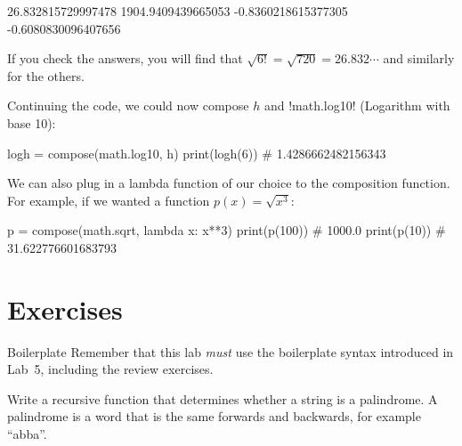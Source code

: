 \documentclass[11pt]{cselabheader}
\begin{document}
\begin{verbatimcode}
26.832815729997478
1904.9409439665053
-0.8360218615377305
-0.6080830096407656
\end{verbatimcode}

If you check the answers, you will find that $\sqrt{ 6! } = \sqrt{ 720 } =
26.832\cdots$ and similarly for the others.

Continuing the code, we could now compose $h$ and \pythoninline!math.log10!
(Logarithm with base 10):
\begin{python3code}
logh = compose(math.log10, h)
print(logh(6)) # 1.4286662482156343
\end{python3code}

We can also plug in a lambda function of our choice to the composition function.
For example, if we wanted a function $p(x) = \sqrt{ x^3 }$:
\begin{python3code}
p = compose(math.sqrt, lambda x: x**3)
print(p(100)) # 1000.0
print(p(10)) # 31.622776601683793
\end{python3code}

\pagebreak

\section{Exercises}
\label{sec:ex}

\begin{warningbox}{Boilerplate}
  Remember that this lab \emph{must} use the
  boilerplate syntax introduced in Lab~5, including the review exercises.
\end{warningbox}

\begin{ex}[palindrome.py] Write a recursive function that determines whether a
    string is a palindrome. A palindrome is a word that is the same forwards and
    backwards, for example ``abba''.
\end{ex}
\end{document}
